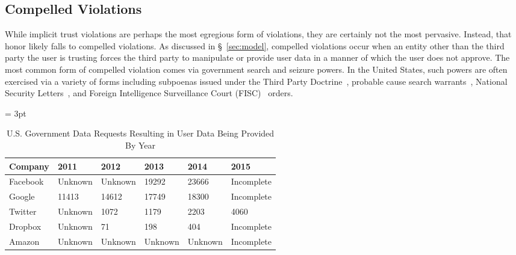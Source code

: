 \subsection{Compelled Violations}

While implicit trust violations are perhaps the most egregious form of
violations, they are certainly not the most pervasive. Instead, that
honor likely falls to compelled violations. As discussed in
\S~\ref{sec:model}, compelled violations occur when an entity other
than the third party the user is trusting forces the third party to
manipulate or provide user data in a manner of which the user does not
approve. The most common form of compelled violation comes via
government search and seizure powers. In the United States, such
powers are often exercised via a variety of forms including subpoenas
issued under the Third Party Doctrine~\cite{thompson-thirdparty},
probable cause search warrants~\cite{us-constitution-amend4}, National
Security Letters~\cite{fbi-nsl}, and Foreign Intelligence Surveillance
Court (FISC)~\cite{fisc} orders.

\begin{table}[thb]
  \footnotesize
  \centering
  \tabulinesep = 3pt
  \begin{tabu} to \textwidth
    { | X[2,c,m]
      | X[1,c,m]
      | X[1,c,m]
      | X[1,c,m]
      | X[1,c,m]
      | X[1,c,m]
      | }
    \hline
    \textbf{Company}
    & \textbf{2011}
    & \textbf{2012}
    & \textbf{2013}
    & \textbf{2014}
    & \textbf{2015}
    \\ \hline 
    Facebook
    & Unknown
    & Unknown
    & 19292
    & 23666
    & Incomplete
    \\ \hline
    Google
    & 11413
    & 14612
    & 17749
    & 18300
    & Incomplete
    \\ \hline
    Twitter
    & Unknown
    & 1072
    & 1179
    & 2203
    & 4060
    \\ \hline 
    Dropbox
    & Unknown
    & 71
    & 198
    & 404
    & Incomplete
    \\ \hline 
    Amazon
    & Unknown
    & Unknown
    & Unknown
    & Unknown
    & Incomplete
    \\ \hline 
 \end{tabu}
  \caption{ U.S. Government Data Requests Resulting in User Data Being
    Provided By Year }
  \label{tab:analysis:violations:reports}
\end{table}

